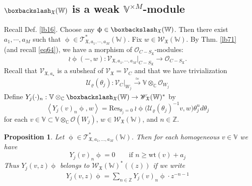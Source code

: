 \documentclass[11pt,b5paper,notitlepage]{article}
\theoremstyle{definition}
\theoremstyle{plain}
\newtheorem{pp}[df]{Proposition}
\newcommand{\fk}{\mathfrak}
\newcommand{\mc}{\mathcal}
\newcommand{\Res}{\mathrm{Res}}
\newcommand{\SV}{\mathscr{V}}
\newcommand{\scr}{\mathscr}
\newcommand{\Vbb}{\mathbb V}
\newcommand{\Wbb}{\mathbb W}
\newcommand{\Cbb}{\mathbb C}
\newcommand{\Zbb}{\mathbb Z}
\newcommand{\wt}{\mathrm{wt}}
\newcommand{\<}{\left\langle}
\renewcommand{\>}{\right\rangle}
\newcommand{\MO}{\mathcal{O}}
\newcommand{\fx}{\mathfrak{X}}
\newcommand{\ST}{\mathscr{T}}
\newcommand{\bbs}{\boxbackslash}
\numberwithin{equation}{subsection}
\begin{document}
 

\subsection{$\bbs_{\fk X}(\Wbb)$ is a weak $\Vbb^{\times M}$-module}
Recall Def. \ref{lb16}. Choose any $\upphi\in\boxbackslash_{\fx}(\Wbb)$. Then there exist $a_1,\cdots, a_M$ such that $\upphi\in \ST_{\fx,a_1,\cdots ,a_M}^*(\Wbb)$. Fix $w\in \scr W_{\fk X}(\Wbb)$. By Thm. \ref{lb71} (and recall \eqref{eq64}), we have a morphism of $\MO_{C-S_\fx}$-modules:
\begin{equation}\label{action1}
\wr\upphi(-,w):\SV_{\fx,a_1,\cdots,a_M}\vert_{C-S_\fx}\rightarrow \MO_{C-S_\fx}.
\end{equation}
Recall that $\scr V_{\fk X,a_\star}$ is a subsheaf of $\scr V_{\fk X}=\scr V_C$ and that we have trivialization
\begin{gather}
\mc U_\varrho(\theta_j):\scr V_C|_{W_j}\xrightarrow{\simeq}\Vbb\otimes_\Cbb\mc O_{W_j}  \label{eq68}
\end{gather}
Define $Y_j(\cdot)_n:\Vbb\otimes_\Cbb\boxbackslash_{\fx}(\Wbb)\rightarrow \scr W_\fx(\Wbb)^*$  by 
    \begin{equation}\label{eq72}
\boxed{  ~  \<Y_j(v)_n\upphi,w\>=\Res_{\theta_j=0}~{\wr\upphi}\big(\mc U_\varrho(\theta_j)^{-1}v,w\big)\theta_j^n d\theta_j~}
    \end{equation}
    for each $v\in \Vbb\subset\Vbb\otimes_\Cbb\mc O(W_j)$, $w\in\scr W_{\fk X}(\Wbb)$, and $n\in \Zbb$. 








   
\begin{pp}\label{lb20}
Let $\upphi\in\scr T_{\fk X,a_1,\dots,a_M}^*(\Wbb)$. Then for each homogeneous $v\in\Vbb$ we have
\begin{equation}\label{eq126}
Y_j(v)_n \upphi=0 \qquad \text{if } n\geq \wt(v)+a_j
\end{equation}
Thus $Y_j(v,z)\upphi$ belongs to $\scr W_{\fk X}(\Wbb)^*((z))$  if we write
\begin{align*}
Y_j(v,z)\upphi=\sum_{n\in\Zbb}Y_j(v)_n\upphi\cdot z^{-n-1}
\end{align*}
\end{pp}
  
\end{document}
